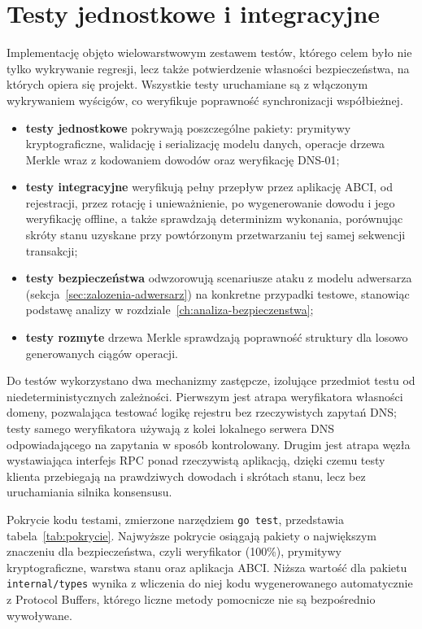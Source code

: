 \section{Testy jednostkowe i integracyjne}
\label{sec:testy}

Implementację objęto wielowarstwowym zestawem testów, którego celem było nie tylko wykrywanie regresji, lecz także potwierdzenie własności bezpieczeństwa, na których opiera się projekt. Wszystkie testy uruchamiane są z włączonym wykrywaniem wyścigów, co weryfikuje poprawność synchronizacji współbieżnej.

\begin{itemize}
    \item \textbf{testy jednostkowe} pokrywają poszczególne pakiety: prymitywy kryptograficzne, walidację i serializację modelu danych, operacje drzewa Merkle wraz z kodowaniem dowodów oraz weryfikację DNS-01;
    \item \textbf{testy integracyjne} weryfikują pełny przepływ przez aplikację ABCI, od rejestracji, przez rotację i unieważnienie, po wygenerowanie dowodu i jego weryfikację offline, a także sprawdzają determinizm wykonania, porównując skróty stanu uzyskane przy powtórzonym przetwarzaniu tej samej sekwencji transakcji;
    \item \textbf{testy bezpieczeństwa} odwzorowują scenariusze ataku z modelu adwersarza (sekcja~\ref{sec:zalozenia-adwersarz}) na konkretne przypadki testowe, stanowiąc podstawę analizy w rozdziale~\ref{ch:analiza-bezpieczenstwa};
    \item \textbf{testy rozmyte} drzewa Merkle sprawdzają poprawność struktury dla losowo generowanych ciągów operacji.
\end{itemize}

Do testów wykorzystano dwa mechanizmy zastępcze, izolujące przedmiot testu od niedeterministycznych zależności. Pierwszym jest atrapa weryfikatora własności domeny, pozwalająca testować logikę rejestru bez rzeczywistych zapytań DNS; testy samego weryfikatora używają z kolei lokalnego serwera DNS odpowiadającego na zapytania w sposób kontrolowany. Drugim jest atrapa węzła wystawiająca interfejs RPC ponad rzeczywistą aplikacją, dzięki czemu testy klienta przebiegają na prawdziwych dowodach i skrótach stanu, lecz bez uruchamiania silnika konsensusu.

Pokrycie kodu testami, zmierzone narzędziem \texttt{go test}, przedstawia tabela~\ref{tab:pokrycie}. Najwyższe pokrycie osiągają pakiety o największym znaczeniu dla bezpieczeństwa, czyli weryfikator (100\%), prymitywy kryptograficzne, warstwa stanu oraz aplikacja ABCI. Niższa wartość dla pakietu \texttt{internal/types} wynika z wliczenia do niej kodu wygenerowanego automatycznie z Protocol Buffers, którego liczne metody pomocnicze nie są bezpośrednio wywoływane.

